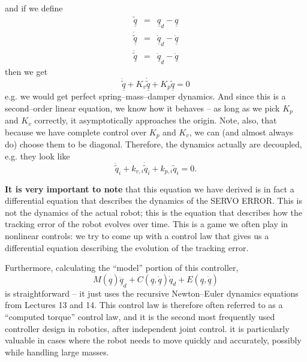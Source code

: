 \documentclass[]{article}
\begin{document}
and if we define
\begin{eqnarray}
 \underline{\tilde{q}} & = & \underline{q}_{d} - \underline{q} \nonumber\\
 \underline{\dot{\tilde{q}}} & = & \dot{\underline{q}}_{d} - \dot{\underline{q}} \nonumber \\
 \underline{\ddot{\tilde{q}}} & = & \ddot{\underline{q}}_{d} - \ddot{\underline{q}} 
\end{eqnarray}
then we get 
\begin{displaymath}
 \underline{\ddot{\tilde{q}}} + K_{v}\underline{\dot{\tilde{q}}} + K_{p}\underline{\tilde{q}} = 0 
 \end{displaymath}
 e.g. we would get perfect spring--mass--damper dynamics. And since this is a second--order linear equation, we know how it behaves -- as long as we pick $K_{p}$ and $K_{v}$ correctly, it asymptotically approaches the origin. Note, also, that because we have complete control over $K_{p}$ and $K_{v}$, we can (and almost always do) choose them to be diagonal. Therefore, the dynamics actually are decoupled, e.g. they look like
 \begin{displaymath}
  \ddot{\tilde{q}}_{i} + k_{v,i}\dot{\tilde{q}}_{i} + k_{p,i}\tilde{q}_{i} = 0.
 \end{displaymath}

 
 \textbf{It is very important to note} that this equation we have derived is in fact a differential equation that describes the dynamics of the SERVO ERROR. This is not the dynamics of the actual robot; this is the equation that describes how the tracking error of the robot evolves over time. This is a game we often play in nonlinear controls: we try to come up with a control law that gives us a differential equation describing the evolution of the tracking error.
 
 Furthermore, calculating the ``model'' portion of this controller, 
 \begin{displaymath}
  M(\underline{q})\ddot{\underline{q}}_{d}  +C(\underline{q}, \underline{\dot{q}})\dot{q}_{d} + E(\underline{q}, \underline{\dot{q}}) 
 \end{displaymath}
is straightforward -- it just uses the recursive Newton--Euler dynamics equations from Lectures 13 and 14. This control law is therefore often referred to as a ``computed torque'' control law, and it is the second most frequently used controller design in robotics, after independent joint control. it is particularly valuable in cases where the robot needs to move quickly and accurately, possibly while handling large masses.
\end{document}
